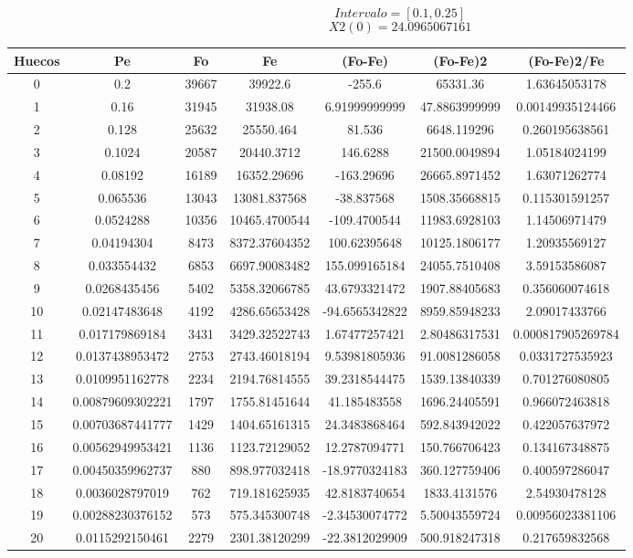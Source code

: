 \documentclass{article}
\begin{document}
$$
Intervalo = [0.1, 0.25]
$$
$$
X2(0) = 24.0965067161
$$
\begin{tabular}{|c|c|c|c|c|c|c|}
Huecos&Pe&Fo&Fe&(Fo{-}Fe)&(Fo{-}Fe)2&(Fo{-}Fe)2/Fe\\
\hline
0&0.2&39667&39922.6&{-}255.6&65331.36&1.63645053178\\
\hline
1&0.16&31945&31938.08&6.91999999999&47.8863999999&0.00149935124466\\
\hline
2&0.128&25632&25550.464&81.536&6648.119296&0.260195638561\\
\hline
3&0.1024&20587&20440.3712&146.6288&21500.0049894&1.05184024199\\
\hline
4&0.08192&16189&16352.29696&{-}163.29696&26665.8971452&1.63071262774\\
\hline
5&0.065536&13043&13081.837568&{-}38.837568&1508.35668815&0.115301591257\\
\hline
6&0.0524288&10356&10465.4700544&{-}109.4700544&11983.6928103&1.14506971479\\
\hline
7&0.04194304&8473&8372.37604352&100.62395648&10125.1806177&1.20935569127\\
\hline
8&0.033554432&6853&6697.90083482&155.099165184&24055.7510408&3.59153586087\\
\hline
9&0.0268435456&5402&5358.32066785&43.6793321472&1907.88405683&0.356060074618\\
\hline
10&0.02147483648&4192&4286.65653428&{-}94.6565342822&8959.85948233&2.09017433766\\
\hline
11&0.017179869184&3431&3429.32522743&1.67477257421&2.80486317531&0.000817905269784\\
\hline
12&0.0137438953472&2753&2743.46018194&9.53981805936&91.0081286058&0.0331727535923\\
\hline
13&0.0109951162778&2234&2194.76814555&39.2318544475&1539.13840339&0.701276080805\\
\hline
14&0.00879609302221&1797&1755.81451644&41.185483558&1696.24405591&0.966072463818\\
\hline
15&0.00703687441777&1429&1404.65161315&24.3483868464&592.843942022&0.422057637972\\
\hline
16&0.00562949953421&1136&1123.72129052&12.2787094771&150.766706423&0.134167348875\\
\hline
17&0.00450359962737&880&898.977032418&{-}18.9770324183&360.127759406&0.400597286047\\
\hline
18&0.0036028797019&762&719.181625935&42.8183740654&1833.4131576&2.54930478128\\
\hline
19&0.00288230376152&573&575.345300748&{-}2.34530074772&5.50043559724&0.00956023381106\\
\hline
20&0.0115292150461&2279&2301.38120299&{-}22.3812029909&500.918247318&0.217659832568\\
\end{tabular}
\end{document}
